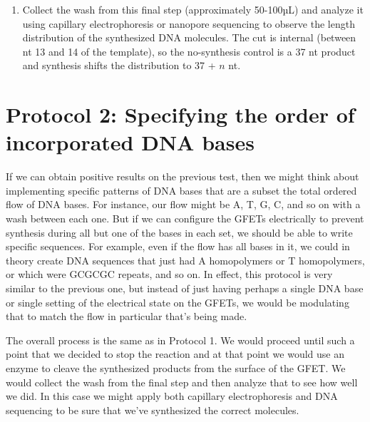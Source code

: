 \documentclass[11pt]{article}
\begin{document}
\begin{enumerate}
    \begin{enumerate} %
        \item Flow the 5'-fluorophore-labelled complement (5'-GACCTACATCCTAAGCTTGCCTG-3') over the chip and anneal with a temperature ramp: approximately 65 °C, then slow cooling to 37 °C. A 37 °C soak alone will not anneal a 23 nt complement at nanomolar concentration on a practical timescale.
        \item Flow HindIII and incubate at 37 °C to cleave the synthesized products from the surface of the GFET.
    \end{enumerate}
    \item Collect the wash from this final step (approximately 50-100µL) and analyze it using capillary electrophoresis or nanopore sequencing to observe the length distribution of the synthesized DNA molecules. The cut is internal (between nt 13 and 14 of the template), so the no-synthesis control is a 37 nt product and synthesis shifts the distribution to 37 + $n$ nt.
\end{enumerate}

\section*{Protocol 2: Specifying the order of incorporated DNA bases}

If we can obtain positive results on the previous test, then we might think about implementing specific patterns of DNA bases that are a subset the total ordered flow of DNA bases.
For instance, our flow might be A, T, G, C, and so on with a wash between each one.
But if we can configure the GFETs electrically to prevent synthesis during all but one of the bases in each set, we should be able to write specific sequences.
For example, even if the flow has all bases in it, we could in theory create DNA sequences that just had A homopolymers or T homopolymers, or which were GCGCGC repeats, and so on.
In effect, this protocol is very similar to the previous one, but instead of just having perhaps a single DNA base or single setting of the electrical state on the GFETs, we would be modulating that to match the flow in particular that's being made.

The overall process is the same as in Protocol 1.
We would proceed until such a point that we decided to stop the reaction and at that point we would use an enzyme to cleave the synthesized products from the surface of the GFET.
We would collect the wash from the final step and then analyze that to see how well we did.
In this case we might apply both capillary electrophoresis and DNA sequencing to be sure that we've synthesized the correct molecules.
\end{document}
